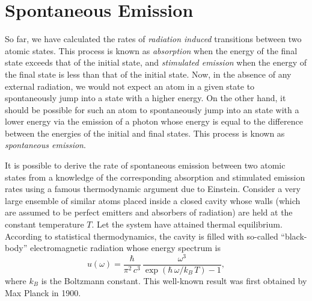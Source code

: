 \section{Spontaneous Emission}
So far, we have calculated the  rates of {\em radiation induced}\/ transitions
between two  atomic states. This process is known as {\em absorption}\/ when the energy of the final state exceeds that
of the initial state, and {\em stimulated emission}\/ when the energy of the final state is less than that
of the initial state. Now, in the absence of any external radiation, we would
not expect an atom in a given state to spontaneously jump into a 
state with a higher energy. On the other hand, it should be possible for
such an atom to spontaneously jump into an state with a lower energy
via the emission of a photon whose energy is equal to the difference
between the energies of the initial and final states. This process is known as {\em spontaneous emission}.

It is possible to derive the  rate of spontaneous emission between two atomic states
from a knowledge of the corresponding absorption and stimulated
emission rates using a famous thermodynamic argument due to Einstein.
Consider a very large ensemble of similar atoms placed inside a closed cavity whose walls (which are assumed to be perfect emitters and absorbers of radiation) are held at
the constant temperature $T$. Let the system have attained thermal equilibrium.
According to statistical thermodynamics, the cavity is filled with so-called ``black-body'' electromagnetic
radiation whose energy spectrum is
\begin{equation}\label{e13.109}
u(\omega) = \frac{\hbar}{\pi^2\,c^3}\,\frac{\omega^3}{\exp(\hbar\,\omega/k_B\,T)-1},
\end{equation}
where $k_B$ is the Boltzmann constant. This well-known result was first
obtained by Max Planck in 1900.

